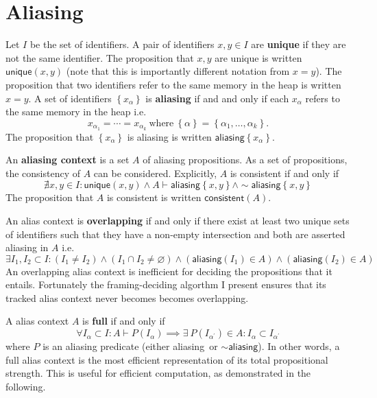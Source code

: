 \documentclass{article}
\newcommand{\tsf}{\textsf}
\newcommand{\tbf}{\textbf}
\newcommand{\set}[1]{\left\{ #1 \right\}}
\newcommand{\p}{^\prime}
\renewcommand{\empty}{\varnothing}
\newcommand{\entails}{\vdash}
\newcommand{\pnot}{\sim}
\newcommand{\aliasing}{\tsf{aliasing}}
\newcommand{\unique}{\tsf{unique}}
\newcommand{\consistent}{\tsf{consistent}}
\begin{document}
\newpage
\section{Aliasing}

Let $I$ be the set of identifiers.
A pair of identifiers $x,y \in I$ are \tbf{unique} if they are not the same identifier.
The proposition that $x,y$ are unique is written $\unique(x,y)$ (note that this is importantly different notation from $x=y$).
The proposition that two identifiers refer to the same memory in the heap is written $x = y$.
A set of identifiers $\set{ x_\alpha }$ is \tbf{aliasing} if and and only if each $x_\alpha$ refers to the same memory in the heap i.e.
$$
x_{\alpha_1} = \cdots = x_{\alpha_k} \ \text{where} \ \set{\alpha} = \set{\alpha_1, \dots, \alpha_k}.
$$
The proposition that $\set{ x_\alpha }$ is aliasing is written $\aliasing \set{ x_\alpha }$.

An \tbf{aliasing context} is a set $A$ of aliasing propositions.
As a set of propositions, the consistency of $A$ can be considered.
Explicitly, $A$ is consistent if and only if
$$
\nexists x,y \in I : \unique(x,y) \land A \entails \aliasing \set{x,y} \land \pnot \aliasing \set{x,y}
$$
The proposition that $A$ is consistent is written $\consistent(A)$.



An alias context is \tbf{overlapping} if and only if there exist at least two unique sets of identifiers such that they have a non-empty intersection and both are asserted aliasing in $A$ i.e.
$$
\exists I_1, I_2 \subset I
:     (I_1 \neq I_2)
\land (I_1 \cap I_2 \neq \empty)
\land (\aliasing (I_1) \in A)
\land (\aliasing (I_2) \in A)
$$
An overlapping alias context is inefficient for deciding the propositions that it entails.
Fortunately the framing-deciding algorthm I present ensures that its tracked alias context never becomes becomes overlapping.

A alias context $A$ is \tbf{full} if and only if
$$
\forall I_\alpha \subset I
:
A \entails P(I_\alpha) \implies \exists \ P(I_{\alpha\p}) \in A : I_\alpha \subset I_{\alpha\p}
$$
where $P$ is an aliasing predicate (either \aliasing \ or $\pnot\aliasing$).
In other words, a full alias context is the most efficient representation of its total propositional strength.
This is useful for efficient computation, as demonstrated in the following.
\end{document}
